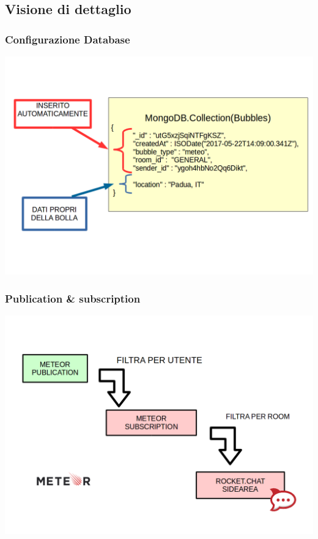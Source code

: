 \subsection{Visione di dettaglio}

\begin{frame}
  \frametitle{Configurazione Database }
  \begin{center}
    \includegraphics[scale=0.28]{img/1mongo.png}
  \end{center}
\end{frame}


\begin{frame}
  \frametitle{Publication \& subscription }
  \begin{center}
    \includegraphics[scale=0.28]{img/3publication.png}
  \end{center}
\end{frame}


